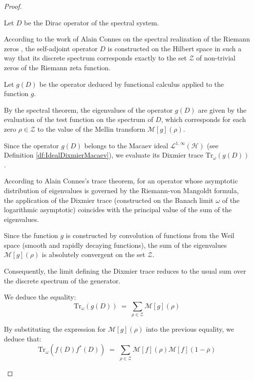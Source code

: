 \documentclass[Riemann_Hypothesis.tex]{subfiles}
\begin{document}
\begin{proof}
    \begin{part_proof}
        Let $D$ be the Dirac operator of the spectral system. \par
        According to the work of Alain Connes on the spectral realization of the Riemann zeros \cite{connes1999_trace}, the self-adjoint operator $D$ is constructed on the Hilbert space in such a way that its discrete spectrum corresponds exactly to the set $\mathcal{Z}$ of non-trivial zeros of the Riemann zeta function. \par
        Let $g(D)$ be the operator deduced by functional calculus applied to the function $g$. \par
        By the spectral theorem, the eigenvalues of the operator $g(D)$ are given by the evaluation of the test function on the spectrum of $D$, which corresponds for each zero $\rho \in \mathcal{Z}$ to the value of the Mellin transform $\mathcal{M}[g](\rho)$.
    \end{part_proof}
    \begin{part_proof}
        Since the operator $g(D)$ belongs to the Macaev ideal $\mathcal{L}^{1,\infty}(\mathcal{H})$ (see Definition \ref{df:IdealDixmierMacaev}), we evaluate its Dixmier trace $\mathrm{Tr}_{\omega}\left(g(D)\right)$. \par
        According to Alain Connes's trace theorem, for an operator whose asymptotic distribution of eigenvalues is governed by the Riemann-von Mangoldt formula, the application of the Dixmier trace (constructed on the Banach limit $\omega$ of the logarithmic asymptotic) coincides with the principal value of the sum of the eigenvalues. \par
        Since the function $g$ is constructed by convolution of functions from the Weil space (smooth and rapidly decaying functions), the sum of the eigenvalues $\mathcal{M}[g](\rho)$ is absolutely convergent on the set $\mathcal{Z}$. \par
        Consequently, the limit defining the Dixmier trace reduces to the usual sum over the discrete spectrum of the generator. \par
        We deduce the equality:
        \begin{equation*}
            \mathrm{Tr}_{\omega}\left(g(D)\right) \;=\; \sum_{\rho\in\mathcal{Z}} \mathcal{M}[g](\rho)
        \end{equation*}

        By substituting the expression for $\mathcal{M}[g](\rho)$ into the previous equality, we deduce that:
        \begin{equation*}
            \mathrm{Tr}_{\omega}\left(f(D)f^*(D)\right) \;=\; \sum_{\rho\in\mathcal{Z}} \mathcal{M}[f](\rho) \mathcal{M}[f](1-\overline{\rho})
        \end{equation*}
    \end{part_proof}
\end{proof}
\end{document}
